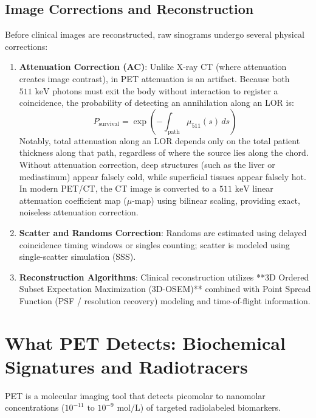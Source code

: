 \documentclass[11pt,a4paper]{article}
\begin{document}
\subsection{Image Corrections and Reconstruction}
Before clinical images are reconstructed, raw sinograms undergo several physical corrections:
\begin{enumerate}
    \item \textbf{Attenuation Correction (AC)}: Unlike X-ray CT (where attenuation creates image contrast), in PET attenuation is an artifact. Because both $511\text{ keV}$ photons must exit the body without interaction to register a coincidence, the probability of detecting an annihilation along an LOR is:
    \begin{equation}
        P_{\text{survival}} = \exp\left(-\int_{\text{path}} \mu_{511}(s) \, ds\right)
    \end{equation}
    Notably, total attenuation along an LOR depends only on the total patient thickness along that path, regardless of where the source lies along the chord. Without attenuation correction, deep structures (such as the liver or mediastinum) appear falsely cold, while superficial tissues appear falsely hot. In modern PET/CT, the CT image is converted to a $511\text{ keV}$ linear attenuation coefficient map ($\mu$-map) using bilinear scaling, providing exact, noiseless attenuation correction.
    \item \textbf{Scatter and Randoms Correction}: Randoms are estimated using delayed coincidence timing windows or singles counting; scatter is modeled using single-scatter simulation (SSS).
    \item \textbf{Reconstruction Algorithms}: Clinical reconstruction utilizes **3D Ordered Subset Expectation Maximization (3D-OSEM)** combined with Point Spread Function (PSF / resolution recovery) modeling and time-of-flight information.
\end{enumerate}

\section{What PET Detects: Biochemical Signatures and Radiotracers}

PET is a molecular imaging tool that detects picomolar to nanomolar concentrations ($10^{-11}\text{ to }10^{-9}\text{ mol/L}$) of targeted radiolabeled biomarkers.
\end{document}
